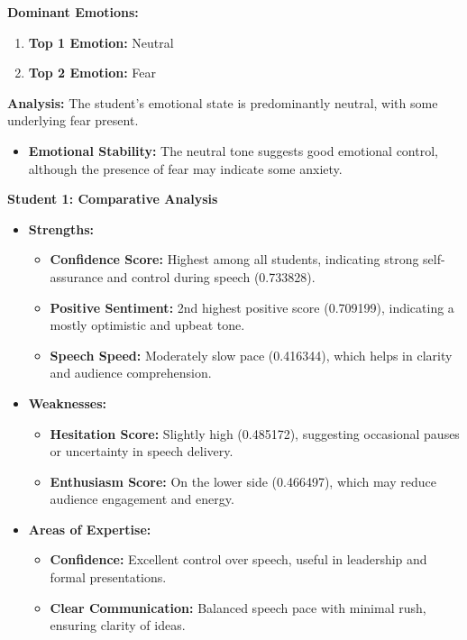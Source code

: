 \documentclass{article}
\begin{document}
    \large{\textbf{Dominant Emotions:}}
    \begin{tcolorbox}[colback=pink!10!white, colframe=pink!80!black, title=Emotional State]
        \begin{enumerate}
            \item \textbf{Top 1 Emotion:} \textcolor{blue!80!black}{Neutral}
            \item \textbf{Top 2 Emotion:} \textcolor{red!80!black}{Fear}
        \end{enumerate}
        \textbf{Analysis:} The student's emotional state is predominantly neutral, with some underlying fear present.
        \begin{itemize}
            \item \textbf{Emotional Stability:} The neutral tone suggests good emotional control, although the presence of fear may indicate some anxiety.
        \end{itemize}
    \end{tcolorbox}
\textbf{Student 1: Comparative Analysis}
\begin{itemize}
    \item \textbf{Strengths:}
    \begin{itemize}
        \item \textbf{Confidence Score:} Highest among all students, indicating strong self-assurance and control during speech (0.733828).
        \item \textbf{Positive Sentiment:} 2nd highest positive score (0.709199), indicating a mostly optimistic and upbeat tone.
        \item \textbf{Speech Speed:} Moderately slow pace (0.416344), which helps in clarity and audience comprehension.
    \end{itemize}
    \item \textbf{Weaknesses:}
    \begin{itemize}
        \item \textbf{Hesitation Score:} Slightly high (0.485172), suggesting occasional pauses or uncertainty in speech delivery.
        \item \textbf{Enthusiasm Score:} On the lower side (0.466497), which may reduce audience engagement and energy.
    \end{itemize}
    \item \textbf{Areas of Expertise:}
    \begin{itemize}
        \item \textbf{Confidence:} Excellent control over speech, useful in leadership and formal presentations.
        \item \textbf{Clear Communication:} Balanced speech pace with minimal rush, ensuring clarity of ideas.
    \end{itemize}
\end{itemize}
\end{document}
